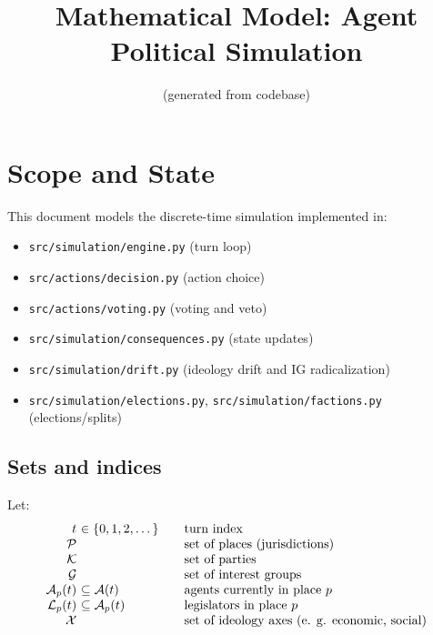 \documentclass[11pt]{article}
\title{Mathematical Model: Agent Political Simulation}
\author{(generated from codebase)}
\date{}
\begin{document}
\maketitle

\section{Scope and State}

This document models the discrete-time simulation implemented in:
\begin{itemize}
  \item \texttt{src/simulation/engine.py} (turn loop)
  \item \texttt{src/actions/decision.py} (action choice)
  \item \texttt{src/actions/voting.py} (voting and veto)
  \item \texttt{src/simulation/consequences.py} (state updates)
  \item \texttt{src/simulation/drift.py} (ideology drift and IG radicalization)
  \item \texttt{src/simulation/elections.py}, \texttt{src/simulation/factions.py} (elections/splits)
\end{itemize}

\subsection{Sets and indices}
Let:
\[
\begin{array}{r@{\ }l@{\qquad}l}
  t &\in \{0,1,2,\dots\} & \text{turn index} \\
  \mathcal{P} & & \text{set of places (jurisdictions)} \\
  \mathcal{K} & & \text{set of parties} \\
  \mathcal{G} & & \text{set of interest groups} \\
  \mathcal{A}_p(t) &\subseteq \mathcal{A}(t) & \text{agents currently in place } p \\
  \mathcal{L}_p(t) &\subseteq \mathcal{A}_p(t) & \text{legislators in place } p \\
  \mathcal{X} & & \text{set of ideology axes (e. g. economic, social)}
\end{array}
\]
\end{document}
